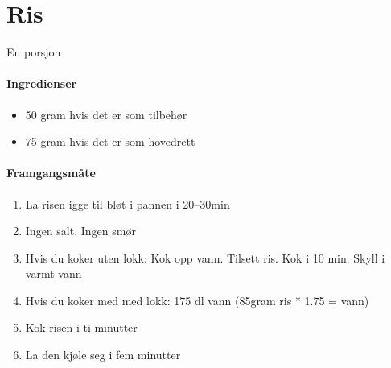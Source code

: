 \section{﻿Ris}
\label{ris}
En porsjon

\paragraph{Ingredienser}
\begin{itemize}[noitemsep]
	\item 50 gram hvis det er som tilbehør
	\item 75 gram hvis det er som hovedrett
\end{itemize}

\paragraph{Framgangsmåte}
\begin{enumerate}[noitemsep]
	\item La risen igge til bløt i pannen i 20--30min
	\item Ingen salt. Ingen smør
	\item Hvis du koker uten lokk: Kok opp vann. Tilsett ris. Kok i 10 min. Skyll i varmt vann
	\item Hvis du koker med med lokk: 175 dl vann (85gram ris * 1.75 = vann)
	\item Kok risen i ti minutter
	\item La den kjøle seg i fem minutter
\end{enumerate}
